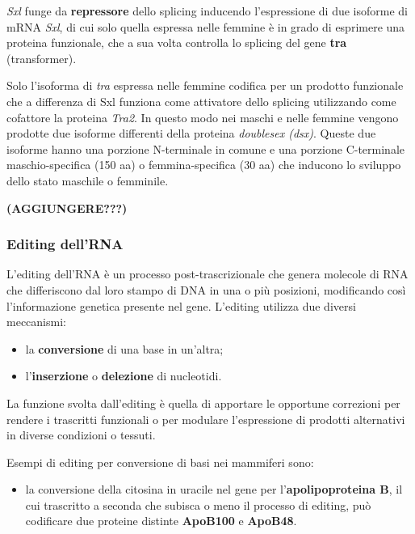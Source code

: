 \documentclass[]{article}
\begin{document}
\emph{Sxl} funge da \textbf{repressore} dello splicing inducendo
l'espressione di due isoforme di mRNA \emph{Sxl}, di cui solo quella
espressa nelle femmine è in grado di esprimere una proteina funzionale,
che a sua volta controlla lo splicing del gene \textbf{tra}
(transformer).

Solo l'isoforma di \emph{tra} espressa nelle femmine codifica per un
prodotto funzionale che a differenza di Sxl funziona come attivatore
dello splicing utilizzando come cofattore la proteina \emph{Tra2}. In
questo modo nei maschi e nelle femmine vengono prodotte due isoforme
differenti della proteina \emph{doublesex (dsx)}. Queste due isoforme
hanno una porzione N-terminale in comune e una porzione C-terminale
maschio-specifica (150 aa) o femmina-specifica (30 aa) che inducono lo
sviluppo dello stato maschile o femminile.

\textbf{(AGGIUNGERE???)}

\subsubsection{Editing dell'RNA}\label{editing-dellrna}

L'editing dell'RNA è un processo post-trascrizionale che genera molecole
di RNA che differiscono dal loro stampo di DNA in una o più posizioni,
modificando così l'informazione genetica presente nel gene. L'editing
utilizza due diversi meccanismi:

\begin{itemize}
\itemsep1pt\parskip0pt
\item
  la \textbf{conversione} di una base in un'altra;
\item
  l'\textbf{inserzione} o \textbf{delezione} di nucleotidi.
\end{itemize}

La funzione svolta dall'editing è quella di apportare le opportune
correzioni per rendere i trascritti funzionali o per modulare
l'espressione di prodotti alternativi in diverse condizioni o tessuti.

Esempi di editing per conversione di basi nei mammiferi sono:

\begin{itemize}
\itemsep1pt\parskip0pt
\item
  la conversione della citosina in uracile nel gene per
  l'\textbf{apolipoproteina B}, il cui trascritto a seconda che subisca
  o meno il processo di editing, può codificare due proteine distinte
  \textbf{ApoB100} e \textbf{ApoB48}.
\end{itemize}
\end{document}
